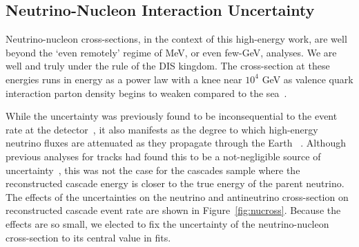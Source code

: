 \documentclass[main.tex]{subfiles}
\begin{document}

\subsection{Neutrino-Nucleon Interaction Uncertainty}
Neutrino-nucleon cross-sections, in the context of this high-energy work, are well beyond the `even remotely' regime of MeV, or even few-GeV, analyses.
We are well and truly under the rule of the DIS kingdom. 
The cross-section at these energies runs in energy as a power law with a knee near $10^{4}$ GeV as valence quark interaction parton density begins to weaken compared to the sea~\cite{GANDHI199681}.

While the uncertainty was previously found to be inconsequential to the event rate at the detector~\cite{osti_1221354, 2015PhDT94D}, it also manifests as the degree to which high-energy neutrino fluxes are attenuated as they propagate through the Earth ~\cite{Vincent:2017svp, PhysRevD.83.113009, Cooper_Sarkar_2011}. 
Although previous analyses for tracks had found this to be a not-negligible source of uncertainty~\cite{Aartsen_2020, Aartsen_2020_prd}, this was not the case for the cascades sample where the reconstructed cascade energy is closer to the true energy of the parent neutrino.
The effects of the uncertainties on the neutrino and antineutrino cross-section on reconstructed cascade event rate are shown in Figure~\ref{fig:nucross}.
Because the effects are so small, we elected to fix the uncertainty of the neutrino-nucleon cross-section to its central value in fits. 
\end{document}
